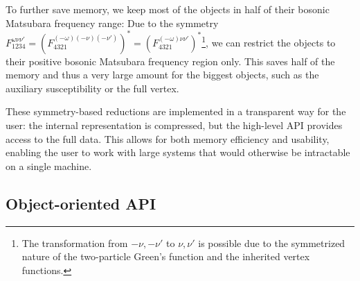 \documentclass[\main/main.tex]{subfiles}
\begin{document}
To further save memory, we keep most of the objects in half of their bosonic Matsubara frequency range: Due to the symmetry $F^{\omega\nu\nu'}_{\mathfrak{1234}}=(F^{(-\omega)(-\nu)(-\nu')}_{\mathfrak{4321}})^{*}=(F^{(-\omega)\nu\nu'}_{\mathfrak{4321}})^{*}$\footnote{The transformation from $-\nu, -\nu'$ to $\nu,\nu'$ is possible due to the symmetrized nature of the two-particle Green's function and the inherited vertex functions.}, we can restrict the objects to their positive bosonic Matsubara frequency region only. This saves half of the memory and thus a very large amount for the biggest objects, such as the auxiliary susceptibility or the full vertex.

These symmetry-based reductions are implemented in a transparent way for the user: the internal representation is compressed, but the high-level API provides access to the full data. This allows for both memory efficiency and usability, enabling the user to work with large systems that would otherwise be intractable on a single machine.

\subsection{Object-oriented API}
\end{document}
